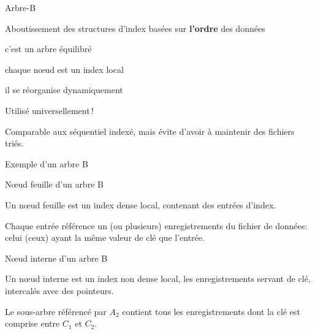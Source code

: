 

\begin{frame}{Arbre-B}

Aboutissement des structures d'index basées sur \textbf{l'ordre}
des données

\vfill

\begin{redbullet}
  \item c'est un arbre équilibré
   \item chaque n{\oe}ud est un index local
  \item il se réorganise dynamiquement
\end{redbullet}

\vfill

Utilisé universellement\,!

\vfill
\begin{blocgauche}
Comparable aux séquentiel indexé, mais évite d'avoir
à maintenir des fichiers triés.
\end{blocgauche}
\end{frame}
\begin{frame}{Exemple d'un arbre B}


\end{frame}


\begin{frame}{N{\oe}ud feuille d'un arbre B}

Un n{\oe}ud feuille est un \alert{index dense local}, contenant des entrées d'index.

\medskip


\vfill

\begin{blocgauche}
Chaque entrée référence un (ou plusieurs) enregistrements du fichier de données:
celui (ceux) ayant la même valeur de clé que l'entrée.
\end{blocgauche}

\end{frame}

\begin{frame}{N{\oe}ud interne d'un arbre B}


Un n{\oe}ud interne est un \alert{index non dense local}, les enregistrements
servant de clé, intercalés avec des pointeurs.

\medskip


\vfill
\begin{blocgauche}
Le sous-arbre référencé par $A_2$ contient tous
les enregistrements dont la clé est comprise
entre $C_1$ et $C_2$.
\end{blocgauche}
\end{frame}


